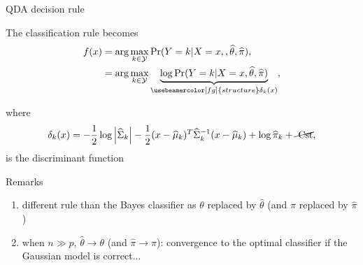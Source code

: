 \documentclass[compress, smaller, serif, 9pt]{beamer}
\newcommand{\structuretext}[1]{{\usebeamercolor[fg]{structure} #1}}
\begin{document}
\begin{frame}{QDA decision rule}

The classification rule becomes
\begin{align*}
 f(x)&= \arg \max_{k \in\mathcal{Y}  } \Pr( Y= k | X=x,, \widehat{\theta},\widehat{\pi}),\\
 &= \arg \max_{k \in\mathcal{Y}  }
 \underbrace{ \log \Pr( Y= k | X=x, \widehat{\theta},\widehat{\pi} )}_{\structuretext{\delta_k(x)}},
\end{align*}\vspace{-3mm}

\noindent where \vspace{-2mm}
\begin{align*}
 \delta_k(x)= -\frac{1}{2} \log\left|\widehat{\Sigma}_k\right| - \frac{1}{2}
 (x-\widehat{\mu}_k)^T \widehat{\Sigma}_k^{-1} (x-\widehat{\mu}_k)+ \log \widehat{\pi}_k + \cancel{ \textrm{ Cst} },
\end{align*}
is the \structuretext{discriminant function}

\begin{block}{Remarks}
   \begin{enumerate}
      \item different rule than the Bayes classifier as $\theta$  replaced by $\widehat{\theta}$
      (and $\pi$ replaced by  $\widehat{\pi}$)
      \item when $ n \gg p$, $\widehat{\theta} \rightarrow \theta$ (and  $\widehat{\pi} \rightarrow \pi$): convergence to the optimal classifier if the Gaussian model is correct...
   \end{enumerate}

\end{block}


\end{frame}
\end{document}

